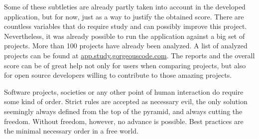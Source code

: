 Some of these subtleties are already partly taken into account in the developed application, but for now, just as a way to justify the obtained score. 
There are countless variables that do require study and can possibly improve this project.
Nevertheless, it was already possible to run the application against a big set of projects.
More than 100 projects have already been analyzed.
A list of analyzed projects can be found at \url{app.study.gorgeouscode.com}.
The reports and the overall score can be of great help not only for users when comparing projects,
but also for open source developers willing to contribute to those amazing projects.

Software projects, societies or any other point of human interaction do require some kind of order.
Strict rules are accepted as necessary evil, the only solution seemingly always defined from the top of the pyramid,
and always cutting the freedom.
Without freedom, however, no advance is possible.
Best practices are the minimal necessary order in a free world.
